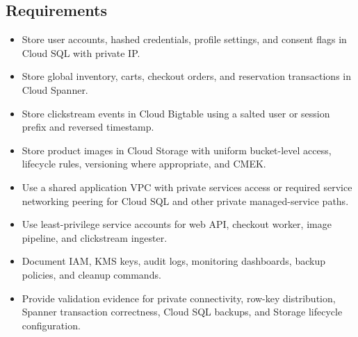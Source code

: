 \subsection*{Requirements}
\begin{itemize}
    \item Store user accounts, hashed credentials, profile settings, and consent flags in Cloud SQL with private IP.
    \item Store global inventory, carts, checkout orders, and reservation transactions in Cloud Spanner.
    \item Store clickstream events in Cloud Bigtable using a salted user or session prefix and reversed timestamp.
    \item Store product images in Cloud Storage with uniform bucket-level access, lifecycle rules, versioning where appropriate, and CMEK.
    \item Use a shared application VPC with private services access or required service networking peering for Cloud SQL and other private managed-service paths.
    \item Use least-privilege service accounts for web API, checkout worker, image pipeline, and clickstream ingester.
    \item Document IAM, KMS keys, audit logs, monitoring dashboards, backup policies, and cleanup commands.
    \item Provide validation evidence for private connectivity, row-key distribution, Spanner transaction correctness, Cloud SQL backups, and Storage lifecycle configuration.
\end{itemize}
